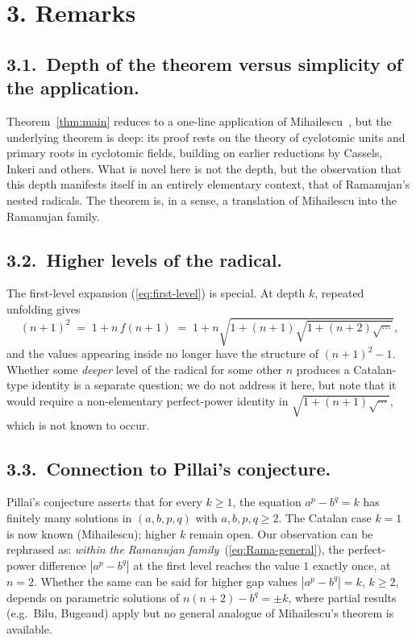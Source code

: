 \documentclass[12pt,a4paper]{article}
\begin{document}
\section*{3. Remarks}

\subsection*{3.1.\ Depth of the theorem versus simplicity of the application.}

Theorem~\ref{thm:main} reduces to a one-line application of
Mihailescu~\cite{Mihailescu2004}, but the underlying theorem is deep:
its proof rests on the theory of cyclotomic units and primary roots
in cyclotomic fields, building on earlier reductions by Cassels,
Inkeri and others.  What is novel here is not the depth, but the
observation that this depth manifests itself in an entirely elementary
context, that of Ramanujan's nested radicals.  The theorem is, in a
sense, a translation of Mihailescu into the Ramanujan family.

\subsection*{3.2.\ Higher levels of the radical.}

The first-level expansion (\ref{eq:first-level}) is special.  At depth
$k$, repeated unfolding gives
\[
(n+1)^2 \;=\; 1 + n \, f(n+1)
\;=\; 1 + n\sqrt{1 + (n+1)\sqrt{1 + (n+2)\sqrt{\cdots}}},
\]
and the values appearing inside no longer have the structure of
$(n+1)^2 - 1$.  Whether some \emph{deeper} level of the radical for
some other $n$ produces a Catalan-type identity is a separate
question; we do not address it here, but note that it would require a
non-elementary perfect-power identity in $\sqrt{1 + (n+1)\sqrt{\cdots}}$,
which is not known to occur.

\subsection*{3.3.\ Connection to Pillai's conjecture.}

Pillai's conjecture asserts that for every $k \geq 1$, the equation
$a^p - b^q = k$ has finitely many solutions in $(a, b, p, q)$ with
$a, b, p, q \geq 2$.  The Catalan case $k = 1$ is now known
(Mihailescu); higher $k$ remain open.  Our observation can be
rephrased as: \emph{within the Ramanujan family}~(\ref{eq:Rama-general}),
the perfect-power difference $|a^p - b^q|$ at the first level reaches
the value $1$ exactly once, at $n = 2$.  Whether the same can be said
for higher gap values $|a^p - b^q| = k$, $k \geq 2$, depends on
parametric solutions of $n(n+2) - b^q = \pm k$, where partial results
(e.g.\ Bilu, Bugeaud) apply but no general analogue of Mihailescu's
theorem is available.
\end{document}
